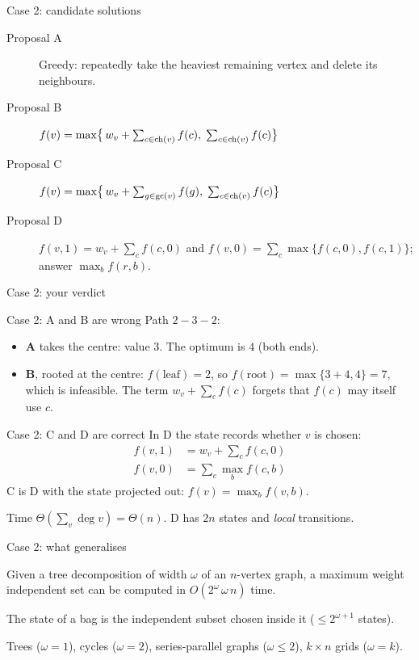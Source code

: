 \begin{frame}{Case 2: candidate solutions}
	\begin{description}
		\item[\alert{Proposal A}] Greedy: repeatedly take the heaviest remaining vertex and delete its neighbours.
		\item[\alert{Proposal B}] $f(v)=\max\bigl\{\,w_v+\sum_{c\in\operatorname{ch}(v)}f(c),\;\sum_{c\in\operatorname{ch}(v)}f(c)\bigr\}$
		\item[\alert{Proposal C}] $f(v)=\max\bigl\{\,w_v+\sum_{g\in\operatorname{gc}(v)}f(g),\;\sum_{c\in\operatorname{ch}(v)}f(c)\bigr\}$
		\item[\alert{Proposal D}] $f(v,1)=w_v+\sum_{c}f(c,0)$ and $f(v,0)=\sum_c\max\{f(c,0),f(c,1)\}$; answer $\max_b f(r,b)$.
	\end{description}
\end{frame}

\begin{frame}{Case 2: your verdict}
\end{frame}

\begin{frame}{Case 2: A and B are wrong}
	Path $2-3-2$:
	\begin{itemize}
		\item \textbf{A} takes the centre: value $3$. The optimum is $4$ (both ends).
		\item \textbf{B}, rooted at the centre: $f(\text{leaf})=2$, so $f(\text{root})=\max\{3+4,4\}=7$, which is infeasible.
		The term $w_v+\sum_c f(c)$ forgets that $f(c)$ may itself use $c$.
	\end{itemize}
\end{frame}

\begin{frame}{Case 2: C and D are correct}
	In D the state records whether $v$ is chosen:
	\begin{align*}
		f(v,1)&=w_v+\sum_{c}f(c,0)\\
		f(v,0)&=\sum_{c}\max_b f(c,b)
	\end{align*}
	C is D with the state projected out: $f(v)=\max_b f(v,b)$.

	\seprule

	Time $\Theta(\sum_v\deg v)=\Theta(n)$. D has $2n$ states and \emph{local} transitions.
\end{frame}

\begin{frame}{Case 2: what generalises}
	\begin{theorem}[folklore]
		Given a tree decomposition of width $\omega$ of an $n$-vertex graph, a maximum weight independent
		set can be computed in $O(2^{\omega}\,\omega\, n)$ time.
	\end{theorem}
	The state of a bag is the independent subset chosen inside it ($\le 2^{\omega+1}$ states).

	\seprule

	Trees ($\omega=1$), cycles ($\omega=2$), series-parallel graphs ($\omega\le2$), $k\times n$ grids ($\omega=k$).
\end{frame}

